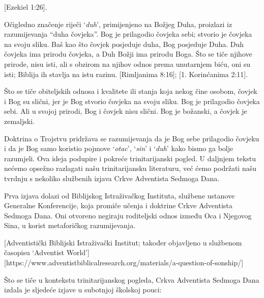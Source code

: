 [Ezekiel 1:26].

Očigledno značenje riječi ‘\textit{duh}’, primijenjeno na Božjeg Duha, proizlazi iz razumijevanja “duha čovjeka”. Bog je prilagodio čovjeka sebi; stvorio je čovjeka na svoju sliku. Baš kao što čovjek posjeduje duha, Bog posjeduje Duha. Duh čovjeka ima prirodu čovjeka, a Duh Božji ima prirodu Boga. Što se tiče njihove prirode, nisu isti, ali s obzirom na njihov odnos prema unutarnjem biću, oni su isti; Biblija ih stavlja na istu razinu. [Rimljanima 8:16]; [1. Korinćanima 2:11].

Što se tiče obiteljskih odnosa i kvalitete ili stanja koja nekog čine osobom, čovjek i Bog su slični, jer je Bog stvorio čovjeka na svoju sliku. Bog je prilagodio čovjeka sebi. Ali u svojoj prirodi, Bog i čovjek nisu slični. Bog je božanski, a čovjek je zemaljski.

Doktrina o Trojstvu pridržava se razumijevanja da je Bog sebe prilagodio čovjeku i da je Bog samo koristio pojmove ‘\textit{otac}’, ‘\textit{sin}’ i ‘\textit{duh}’ kako bismo ga bolje razumjeli. Ova ideja podupire i pokreće trinitarijanski pogled. U daljnjem tekstu nećemo opsežno razlagati našu trinitarijansku literaturu, već ćemo podržati našu tvrdnju s nekoliko službenih izjava Crkve Adventista Sedmoga Dana.

Prva izjava dolazi od Biblijskog Istraživačkog Instituta, službene ustanove Generalne Konferencije, koja promiče učenja i doktrine Crkve Adventista Sedmoga Dana. Oni otvoreno negiraju roditeljski odnos između Oca i Njegovog Sina, u korist metaforičkog razumijevanja.

[Adventistički Biblijski Istraživački Institut; također objavljeno u službenom časopisu ‘Adventist World’][https://www.adventistbiblicalresearch.org/materials/a-question-of-sonship/]

Što se tiče  u kontekstu trinitarijanskog pogleda, Crkva Adventista Sedmoga Dana izdala je sljedeće izjave u subotnjoj školskoj pouci:

